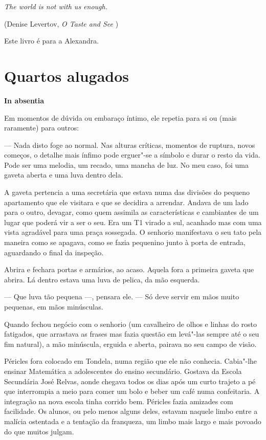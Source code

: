 \thispagestyle{empty}
\vspace*{7cm}
\begin{flushright}
\emph{The world is not with us enough.}

(Denise Levertov, \emph{O Taste and See })

\vspace*{3cm}

Este livro é para a Alexandra.
\end{flushright}

\part{Quartos alugados}

\movetooddpage\vspace*{1.8cm}
\noindent{}\textbf{In absentia}
\bigskip

Em momentos de dúvida ou embaraço íntimo, ele repetia para si ou (mais
raramente) para outros:

  --- Nada disto foge ao normal. Nas alturas críticas, momentos de
  ruptura, novos começos, o detalhe mais ínfimo pode erguer"-se a símbolo
  e durar o resto da vida. Pode ser uma melodia, um recado, uma mancha
  de luz. No meu caso, foi uma gaveta aberta e uma luva dentro dela.


A gaveta pertencia a uma secretária que estava numa das divisões do
pequeno apartamento que ele visitara e que se decidira a arrendar.
Andava de um lado para o outro, devagar, como quem assimila as
características e cambiantes de um lugar que poderá vir a ser o seu. Era
um T1 virado a sul, acanhado mas com uma vista agradável para uma praça
sossegada. O senhorio manifestava o seu tato pela maneira como se
apagava, como se fazia pequenino junto à porta de entrada, aguardando o
final da inspeção.

Abrira e fechara portas e armários, ao acaso. Aquela fora a primeira
gaveta que abrira. Lá dentro estava uma luva de pelica, da mão esquerda.

--- Que luva tão pequena ---, pensara ele. --- Só deve servir em mãos muito pequenas, em mãos minúsculas.

Quando fechou negócio com o senhorio (um cavalheiro de olhos e linhas do
rosto fatigados, que arrastava as frases mas fazia questão em levá"-las
sempre até o seu fim natural), a mão minúscula, erguida e aberta,
pairava no seu campo de visão.

Péricles fora colocado em Tondela, numa região que ele não conhecia.
Cabia"-lhe ensinar Matemática a adolescentes do ensino secundário.
Gostava da Escola Secundária José Relvas, aonde chegava todos os dias
após um curto trajeto a pé que interrompia a meio para comer um bolo e
beber um café numa confeitaria. A integração na nova escola tinha
corrido bem. Péricles fazia amizades com facilidade. Os alunos, ou pelo
menos alguns deles, estavam naquele limbo entre a malícia ostentada e
a tentação da franqueza, um limbo mais largo e mais povoado do que
muitos julgam.

